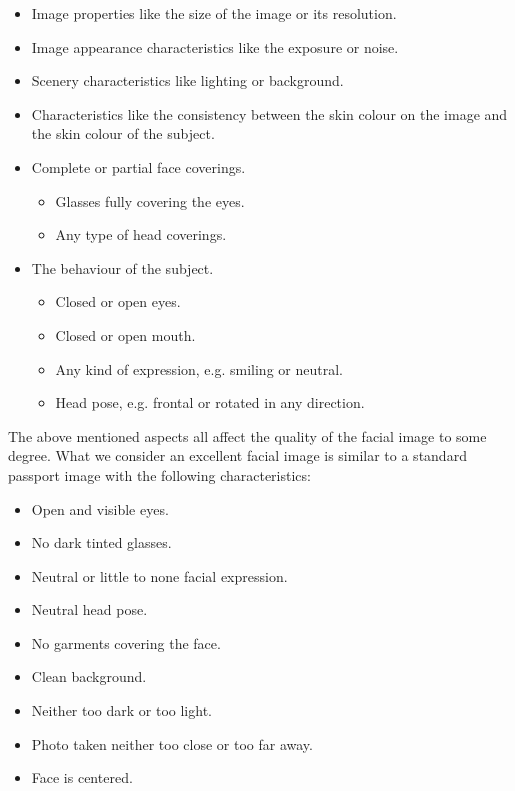 \begin{itemize}
    \item Image properties like the size of the image or its resolution.
    \item Image appearance characteristics like the exposure or noise.
    \item Scenery characteristics like lighting or background.
    \item Characteristics like the consistency between the skin colour on the image and the skin colour of the subject.
    \item Complete or partial face coverings.
    \begin{itemize}
        \item Glasses fully covering the eyes.
        \item Any type of head coverings.
    \end{itemize}
    \item The behaviour of the subject.
    \begin{itemize}
        \item Closed or open eyes.
        \item Closed or open mouth.
        \item Any kind of expression, e.g. smiling or neutral.
        \item Head pose, e.g. frontal or rotated in any direction.
    \end{itemize}
\end{itemize}

The above mentioned aspects all affect the quality of the facial image to some degree. What we consider an excellent facial image is similar to a standard passport image with the following characteristics: 
\begin{itemize}
    \item Open and visible eyes.
    \item No dark tinted glasses. 
    \item Neutral or little to none facial expression.
    \item Neutral head pose.
    \item No garments covering the face.
    \item Clean background.
    \item Neither too dark or too light.
    \item Photo taken neither too close or too far away.
    \item Face is centered.
\end{itemize}

